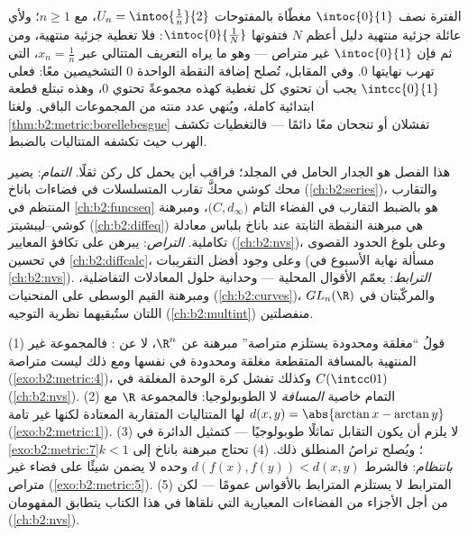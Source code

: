 \begin{example}\label{ex:b2:metric:covers}
الفترة نصف  $\intoc{0}{1}$ مغطّاة بالمفتوحات
$U_n = \intoo{\frac1n}{2}$، مع $n \geq 1$؛ ولأي عائلة جزئية منتهية
دليل أعظم $N$ فتفوتها $\intoc{0}{\frac1N}$: فلا تغطية
جزئية منتهية، ومن ثم فإن $\intoc{0}{1}$ غير متراص --- وهو ما يراه
التعريف المتتالي عبر $x_n = \frac1n$، التي تهرب نهايتها
$0$. وفي المقابل، تُصلح إضافة النقطة الواحدة $0$
التشخيصين معًا: فعلى $\intcc{0}{1}$ يجب أن تحتوي كل تغطية كهذه
مجموعةً تحتوي $0$، وهذه تبتلع قطعة ابتدائية كاملة،
ويُنهي عدد منته من المجموعات الباقي. ولغتا
\cref{thm:b2:metric:borellebesgue} تفشلان أو تنجحان معًا
دائمًا --- فالتغطيات تكشف الهرب حيث تكشفه المتتاليات بالضبط.
\end{example}

\begin{remark}\label{rem:b2:metric:perspectives}
هذا الفصل هو الجدار الحامل في المجلد؛ فراقب أين يحمل
كل ركن ثقلًا. \emph{التمام}: يصير محك كوشي محكَّ تقارب
المتسلسلات في فضاءات باناخ (\cref{ch:b2:series})، والتقارب
المنتظم في \cref{ch:b2:funcseq} هو بالضبط التقارب في الفضاء
التام $\bigl(C, d_\infty\bigr)$، ومبرهنة كوشي--ليبشيتز
(\cref{ch:b2:diffeq}) هي مبرهنة النقطة الثابتة عند باناخ
بلباس معادلة تكاملية. \emph{التراص}: يبرهن على
تكافؤ المعايير (\cref{ch:b2:nvs})، وعلى بلوغ
الحدود القصوى في تحسين \cref{ch:b2:diffcalc}، وعلى
وجود أفضل التقريبات (مسألة نهاية الأسبوع في \cref{ch:b2:nvs}).
\emph{الترابط}: يعمّم الأقوال المحلية
--- وحدانية حلول المعادلات التفاضلية، ومبرهنة القيم
الوسطى على المنحنيات (\cref{ch:b2:curves})، والمركّبتان
في $GL_n(\R)$ اللتان ستُبقيهما نظرية التوجيه
(\cref{ch:b2:multint}) منفصلتين.
\end{remark}

\begin{remark}\label{rem:b2:metric:pitfalls}
(1) قولُ ``مغلقة ومحدودة يستلزم متراصة'' مبرهنة عن
$\R^n$، لا عن : فالمجموعة غير المنتهية بالمسافة
المتقطعة مغلقة ومحدودة في نفسها ومع ذلك ليست متراصة
(\cref{exo:b2:metric:4})، وكذلك تفشل كرة الوحدة المغلقة في
$C(\intcc01)$ (\cref{ch:b2:nvs}). (2) التمام خاصية
\emph{المسافة} لا الطوبولوجيا: فالمجموعة $\R$
مع $d(x,y) = \abs{\arctan x - \arctan y}$ لها المتتاليات المتقاربة
المعتادة لكنها غير تامة
(\cref{exo:b2:metric:1}). (3) لا يلزم أن يكون التقابل 
تماثلًا طوبولوجيًا --- كتمثيل الدائرة في
\cref{exo:b2:metric:7}؛ ويُصلح تراصُ المنطلق ذلك.
(4) تحتاج مبرهنة باناخ إلى $k < 1$ \emph{بانتظام}: فالشرط
$d(f(x), f(y)) < d(x,y)$ وحده لا يضمن شيئًا على فضاء
غير متراص (\cref{exo:b2:metric:5}). (5) المترابط لا
يستلزم المترابط بالأقواس عمومًا --- لكن من أجل الأجزاء
 من الفضاءات المعيارية التي نلقاها في هذا الكتاب
يتطابق المفهومان (\cref{ch:b2:nvs}).
\end{remark}


